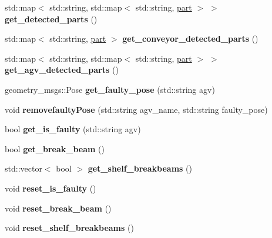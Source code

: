 \begin{DoxyCompactItemize}
std\+::map$<$ std\+::string, std\+::map$<$ std\+::string, \hyperlink{structPart}{part} $>$ $>$ {\bfseries get\+\_\+detected\+\_\+parts} ()
\item 
\mbox{\label{classCamera_adfe123d4dae52b8e67b283320e4326a0}} 
std\+::map$<$ std\+::string, \hyperlink{structPart}{part} $>$ {\bfseries get\+\_\+conveyor\+\_\+detected\+\_\+parts} ()
\item 
\mbox{\label{classCamera_a589ef283cc1abf191b9085f810889638}} 
std\+::map$<$ std\+::string, std\+::map$<$ std\+::string, \hyperlink{structPart}{part} $>$ $>$ {\bfseries get\+\_\+agv\+\_\+detected\+\_\+parts} ()
\item 
\mbox{\label{classCamera_a26fa6dc4a9d248d161b1ef537684282e}} 
geometry\+\_\+msgs\+::\+Pose {\bfseries get\+\_\+faulty\+\_\+pose} (std\+::string agv)
\item 
\mbox{\label{classCamera_a865ea80a87e66035fa6aab3ee5006894}} 
void {\bfseries removefaulty\+Pose} (std\+::string agv\+\_\+name, std\+::string faulty\+\_\+pose)
\item 
\mbox{\label{classCamera_a51b8dee3ec0df47e0df60a734fe4cc1e}} 
bool {\bfseries get\+\_\+is\+\_\+faulty} (std\+::string agv)
\item 
\mbox{\label{classCamera_af4b4ea6b0d5c1bd6122a320c51fd4b96}} 
bool {\bfseries get\+\_\+break\+\_\+beam} ()
\item 
\mbox{\label{classCamera_a36d8018f0e3bd305830b3857a9367205}} 
std\+::vector$<$ bool $>$ {\bfseries get\+\_\+shelf\+\_\+breakbeams} ()
\item 
\mbox{\label{classCamera_a64e313a11351ace4c18f491f9379ff3a}} 
void {\bfseries reset\+\_\+is\+\_\+faulty} ()
\item 
\mbox{\label{classCamera_a95207ab68c279f26e4f0a44cc705f6e8}} 
void {\bfseries reset\+\_\+break\+\_\+beam} ()
\item 
\mbox{\label{classCamera_a9925131ea60f20f755a2be92ef0a8e61}} 
void {\bfseries reset\+\_\+shelf\+\_\+breakbeams} ()
\item 

\end{DoxyCompactItemize}
